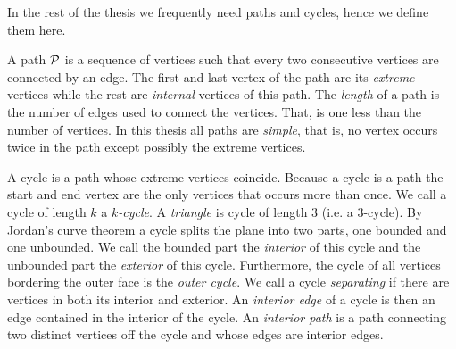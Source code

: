   In the rest of the thesis we frequently need paths and cycles, hence we define them here.

  A path $\P$ is a sequence of vertices such that every two consecutive vertices are connected by an edge. The first and last vertex of the path are its \emph{extreme} vertices while the rest are \emph{internal} vertices of this path. The \emph{length} of a path is the number of edges used to connect the vertices. That, is one less than the number of vertices. In this thesis all paths are \emph{simple}, that is, no vertex occurs twice in the path except possibly the extreme vertices.

  A cycle is a path whose extreme vertices coincide. Because a cycle is a path the start and end vertex are the only vertices that occurs more than once. We call a cycle of length $k$  a \emph{$k$-cycle}. A \emph{triangle} is cycle of length $3$ (i.e. a $3$-cycle). By Jordan's curve theorem a cycle splits the plane into two parts, one bounded and one unbounded. We call the bounded part the \emph{interior} of this cycle and the unbounded part the \emph{exterior} of this cycle.
  Furthermore, the cycle of all vertices bordering the outer face is the \emph{outer cycle}.
  We call a cycle \emph{separating} if there are vertices in both its interior and exterior.
  An \emph{interior edge} of a cycle is then an edge contained in the interior of the cycle.
  An \emph{interior path} is a path connecting two distinct vertices off the cycle and whose edges are interior edges.
